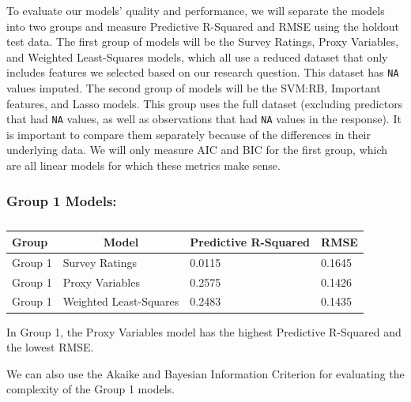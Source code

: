 \documentclass[
  man,floatsintext]{apa6}
\begin{document}
To evaluate our models' quality and performance, we will separate the models into two groups and measure Predictive R-Squared and RMSE using the holdout test data. The first group of models will be the Survey Ratings, Proxy Variables, and Weighted Least-Squares models, which all use a reduced dataset that only includes features we selected based on our research question. This dataset has \texttt{NA} values imputed. The second group of models will be the SVM:RB, Important features, and Lasso models. This group uses the full dataset (excluding predictors that had \texttt{NA} values, as well as observations that had \texttt{NA} values in the response). It is important to compare them separately because of the differences in their underlying data. We will only measure AIC and BIC for the first group, which are all linear models for which these metrics make sense.

\hypertarget{group-1-models}{%
\subsubsection{Group 1 Models:}\label{group-1-models}}

\begin{table}[H]

\begin{center}
\begin{threeparttable}

\caption{\label{tab:pred-rsquared-RMSE}}

\begin{tabular}{llll}
\toprule
Group & \multicolumn{1}{c}{Model} & \multicolumn{1}{c}{Predictive R-Squared} & \multicolumn{1}{c}{RMSE}\\
\midrule
Group 1 & Survey Ratings & 0.0115 & 0.1645\\
Group 1 & Proxy Variables & 0.2575 & 0.1426\\
Group 1 & Weighted Least-Squares & 0.2483 & 0.1435\\
\bottomrule
\end{tabular}

\end{threeparttable}
\end{center}

\end{table}

In Group 1, the Proxy Variables model has the highest Predictive R-Squared and the lowest RMSE.

We can also use the Akaike and Bayesian Information Criterion for evaluating the complexity of the Group 1 models.
\end{document}
